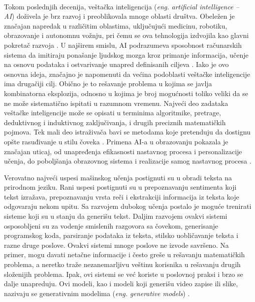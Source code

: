 \documentclass[12pt]{article}
\begin{document}
\paragraph{}
Tokom poslednjih decenija, veštačka inteligencija (\textit{eng. artificial intelligence – AI}) doživela je brz razvoj i preoblikovala mnoge oblasti društva.
Obeležen je značajan napredak u različitim oblastima, uključujući medicinu, robotiku, obrazovanje i autonomnu vožnju, pri čemu se ova tehnologija izdvojila kao glavni pokretač razvoja \cite{montenegro2023impact}. U najširem smislu, AI podrazumeva sposobnost računarskih sistema da imitiraju ponašanje ljudskog mozga kroz primanje informacija, učenje na osnovu podataka i ostvarivanje unapred definisanih ciljeva \cite{montenegro2023impact}. Iako je ovo osnovna ideja, značajno je napomenuti da većina podoblasti veštačke inteligencije ima drugačiji cilj. Obično je to rešavanje problema u kojima se javlja kombinatorna eksplozija, odnosno u kojima je broj mogućnosti toliko veliki da se ne može sistematično ispitati u razumnom vremenu. Najveći deo zadataka veštačke inteligencije može se opisati u terminima algoritmike, pretrage, deduktivnog i induktivnog zaključivanja, i drugih preciznih matematičkih pojmova. Tek mali deo istraživača bavi se metodama koje pretenduju da dostignu opšte rasuđivanje u stilu čoveka \cite{vestackainteligencija2025}.
Primena AI-a u obrazovanju pokazala je značajan uticaj, od unapređenja efikasnosti nastavnog procesa i personalizacije učenja, do poboljšanja obrazovnog sistema i realizacije samog nastavnog procesa \cite{montenegro2023impact}.  

Verovatno najveći uspesi mašinskog učenja postignuti su u obradi teksta na prirodnom jeziku. Rani uspesi postignuti su u prepoznavanju sentimenta koji tekst izražava, prepoznavanju vrsta reči i ekstrakciji informacija iz teksta koje odgovaraju nekom upitu. Sa razvojem dubokog učenja postalo je moguće trenirati sisteme koji su u stanju da generišu tekst. Daljim razvojem ovakvi sistemi osposobljeni su za vodenje smislenih razgovora sa čovekom, generisanje programskog koda, parsiranje podataka iz teksta, stilsko uobličavanje teksta i razne druge
poslove. Ovakvi sistemi mnoge poslove ne izvode savršeno. Na primer, mogu davati netačne informacije i često greše u rešavanju matematičkih problema, a neretko traže nezanemarljivu veštinu korisnika u rešavanju drugih složenijih problema. Ipak, ovi sistemi se već koriste u poslovnoj praksi i brzo se dalje unapreduju. Ovi modeli, kao i modeli koji generišu video zapise ili slike, nazivaju se generativnim modelima (\textit{eng. generative models}) \cite{vestackainteligencija2025}. 
\end{document}
